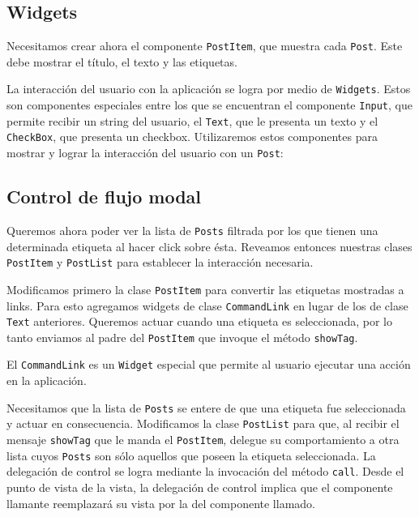 \subsection{Widgets}
\label{sub-widget}

Necesitamos crear ahora el componente \verb'PostItem', que muestra cada \verb'Post'. Este debe mostrar el título, el texto y las etiquetas.

La interacción del usuario con la aplicación se logra por medio de \verb"Widgets"\cite{WDGTS}. Estos son componentes especiales entre los que se encuentran el componente \verb"Input", que permite recibir un string del usuario, el \verb"Text", que le presenta un texto y el \verb"CheckBox", que presenta un checkbox. Utilizaremos estos componentes para mostrar y lograr la interacción del usuario con un \verb'Post':


\subsection{Control de flujo modal}
\label{sub-modal-flow}
Queremos ahora poder ver la lista de \verb"Posts" filtrada por los que tienen una determinada etiqueta al hacer click sobre ésta. Reveamos entonces nuestras clases \verb"PostItem" y \verb"PostList" para establecer la interacción necesaria.


Modificamos primero la clase \verb"PostItem" para convertir las etiquetas mostradas a links. Para esto agregamos widgets de clase \verb"CommandLink" en lugar de los de clase \verb"Text" anteriores. Queremos actuar cuando una etiqueta es seleccionada, por lo tanto enviamos al padre del \verb'PostItem' que invoque el método \verb'showTag'.


El \verb"CommandLink" es un \verb"Widget" especial que permite al usuario ejecutar una acción en la aplicación.

Necesitamos que la lista de \verb"Posts" se entere de que una etiqueta fue seleccionada y actuar en consecuencia. Modificamos la clase \verb"PostList" para que, al recibir el mensaje \verb'showTag' que le manda el \verb'PostItem', delegue su comportamiento a otra lista cuyos \verb"Posts" son sólo aquellos que poseen la etiqueta seleccionada. La delegación de control se logra mediante la invocación del método \verb"call". Desde el punto de vista de la vista, la delegación de control implica que el componente llamante reemplazará su vista por la del componente llamado.

